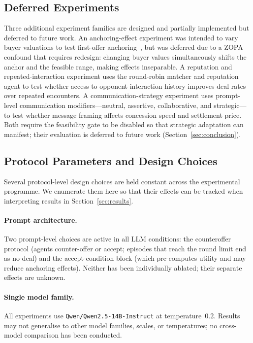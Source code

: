\subsection{Deferred Experiments}
\label{sec:deferred}

Three additional experiment families are designed and partially implemented but deferred to future work.  An anchoring-effect experiment was intended to vary buyer valuations to test first-offer anchoring~\cite{galinsky2001}, but was deferred due to a ZOPA confound that requires redesign: changing buyer values simultaneously shifts the anchor and the feasible range, making effects inseparable.  A reputation and repeated-interaction experiment uses the round-robin matcher and reputation agent to test whether access to opponent interaction history improves deal rates over repeated encounters.  A communication-strategy experiment uses prompt-level communication modifiers---neutral, assertive, collaborative, and strategic---to test whether message framing affects concession speed and settlement price.  Both require the feasibility gate to be disabled so that strategic adaptation can manifest; their evaluation is deferred to future work (Section~\ref{sec:conclusion}).


\subsection{Protocol Parameters and Design Choices}
\label{sec:confounds}

Several protocol-level design choices are held constant across the experimental programme.  We enumerate them here so that their effects can be tracked when interpreting results in Section~\ref{sec:results}.

\paragraph{Prompt architecture.}
Two prompt-level choices are active in all LLM conditions: the counteroffer protocol (agents counter-offer or accept; episodes that reach the round limit end as no-deal) and the accept-condition block (which pre-computes utility and may reduce anchoring effects).  Neither has been individually ablated; their separate effects are unknown.

\paragraph{Single model family.}
All experiments use \texttt{Qwen/Qwen2.5-14B-Instruct} at temperature~0.2.  Results may not generalise to other model families, scales, or temperatures; no cross-model comparison has been conducted.

